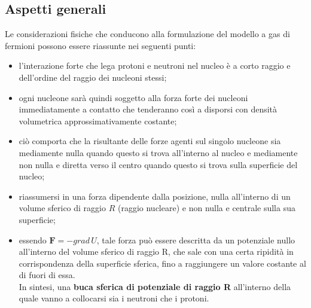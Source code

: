 \subsection{Aspetti generali}\label{sec:aspetti-generali}

Le considerazioni fisiche che conducono alla formulazione del modello a gas di fermioni possono essere riassunte nei seguenti punti:
\begin{itemize}
	\item l’interazione forte che lega protoni e neutroni nel nucleo è a corto raggio
	e dell’ordine del raggio dei nucleoni stessi;
	\item ogni nucleone sarà quindi soggetto alla forza forte dei nucleoni
	immediatamente a contatto che tenderanno così a disporsi con densità
	volumetrica approssimativamente costante;
	\item ciò comporta che la risultante delle forze agenti sul singolo nucleone sia
	mediamente nulla quando questo si trova all’interno al nucleo e mediamente non nulla e diretta verso il centro quando questo si trova sulla superficie del nucleo;
	\item riassumersi in una forza dipendente dalla posizione, nulla all’interno di un volume sferico di raggio $R$ (raggio nucleare) e non nulla e centrale sulla sua superficie;
	\item essendo $ \bm{F} = - grad \, U$, tale forza può essere descritta da un potenziale
	nullo all’interno del volume sferico di raggio R, che sale con una certa ripidità in corrispondenza della superficie sferica,
	fino a raggiungere un valore costante al di fuori di essa. \\
	In sintesi, una \textbf{buca sferica di potenziale di raggio R} all’interno della quale vanno a collocarsi sia i neutroni che i protoni.
\end{itemize}
\bisgkip

